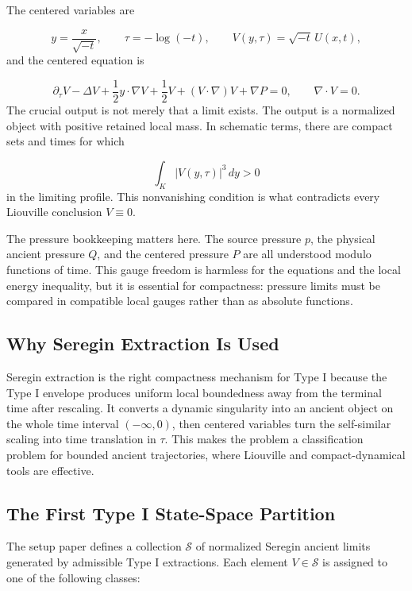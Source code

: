 \documentclass[11pt]{amsart}
\begin{document}
The centered variables are

\[
  y=\frac{x}{\sqrt{-t}},\qquad
  \tau=-\log(-t),\qquad
  V(y,\tau)=\sqrt{-t}\,U(x,t),
\]
and the centered equation is

\[
  \partial_\tau V-\Delta V+\frac12 y\cdot\nabla V+\frac12 V
  +(V\cdot\nabla)V+\nabla P=0,
  \qquad \nabla\cdot V=0 .
\]
The crucial output is not merely that a limit exists.  The output is a normalized object with positive retained local mass.  In schematic terms, there are compact sets and times for which

\[
  \int_{K} |V(y,\tau)|^3\,dy > 0
\]
in the limiting profile.  This nonvanishing condition is what contradicts every Liouville conclusion \(V\equiv0\).

The pressure bookkeeping matters here.  The source pressure \(p\), the physical ancient pressure \(Q\), and the centered pressure \(P\) are all understood modulo functions of time.  This gauge freedom is harmless for the equations and the local energy inequality, but it is essential for compactness: pressure limits must be compared in compatible local gauges rather than as absolute functions.

\subsection{Why Seregin Extraction Is Used}

Seregin extraction is the right compactness mechanism for Type I because the Type I envelope produces uniform local boundedness away from the terminal time after rescaling.  It converts a dynamic singularity into an ancient object on the whole time interval \((-\infty,0)\), then centered variables turn the self-similar scaling into time translation in \(\tau\).  This makes the problem a classification problem for bounded ancient trajectories, where Liouville and compact-dynamical tools are effective.

\subsection{The First Type I State-Space Partition}

The setup paper defines a collection \(\mathcal S\) of normalized Seregin ancient limits generated by admissible Type I extractions.  Each element \(V\in\mathcal S\) is assigned to one of the following classes:
\end{document}
